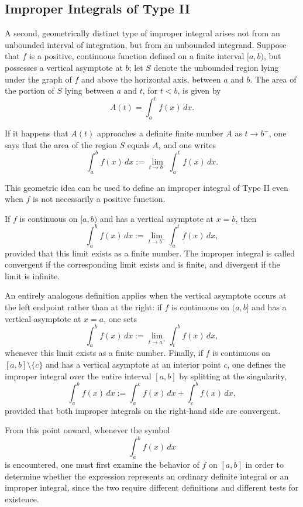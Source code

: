 \subsection{Improper Integrals of Type II}

A second, geometrically distinct type of improper integral arises not from an unbounded interval of integration, but from an unbounded integrand. Suppose that $f$ is a positive, continuous function defined on a finite interval $[a,b)$, but possesses a vertical asymptote at $b$; let $S$ denote the unbounded region lying under the graph of $f$ and above the horizontal axis, between $a$ and $b$. The area of the portion of $S$ lying between $a$ and $t$, for $t < b$, is given by
\[
A(t) = \int_a^t f(x) \, dx.
\]

If it happens that $A(t)$ approaches a definite finite number $A$ as $t \to b^-$, one says that the area of the region $S$ equals $A$, and one writes
\[
\int_a^b f(x) \, dx := \lim_{t \to b^-} \int_a^t f(x) \, dx.
\]

This geometric idea can be used to define an improper integral of Type II even when $f$ is not necessarily a positive function.

\begin{definition}
If $f$ is continuous on $[a,b)$ and has a vertical asymptote at $x = b$, then
\[
\int_a^b f(x) \, dx := \lim_{t \to b^-} \int_a^t f(x) \, dx,
\]
provided that this limit exists as a finite number. The improper integral is called convergent if the corresponding limit exists and is finite, and divergent if the limit is infinite.
\end{definition}

An entirely analogous definition applies when the vertical asymptote occurs at the left endpoint rather than at the right: if $f$ is continuous on $(a,b]$ and has a vertical asymptote at $x = a$, one sets \[
\int_a^b f(x) \, dx := \lim_{t \to a^+} \int_t^b f(x) \, dx,
\] whenever this limit exists as a finite number. Finally, if $f$ is continuous on $[a,b] \setminus \{c\}$ and has a vertical asymptote at an interior point $c$, one defines the improper integral over the entire interval $[a,b]$ by splitting at the singularity,
\[
\int_a^b f(x) \, dx := \int_a^c f(x) \, dx + \int_c^b f(x) \, dx,
\]
provided that both improper integrals on the right-hand side are convergent.

\begin{remark}
From this point onward, whenever the symbol \[
\int_a^b f(x) \, dx
\] is encountered, one must first examine the behavior of $f$ on $[a,b]$ in order to determine whether the expression represents an ordinary definite integral or an improper integral, since the two require different definitions and different tests for existence.
\end{remark}

